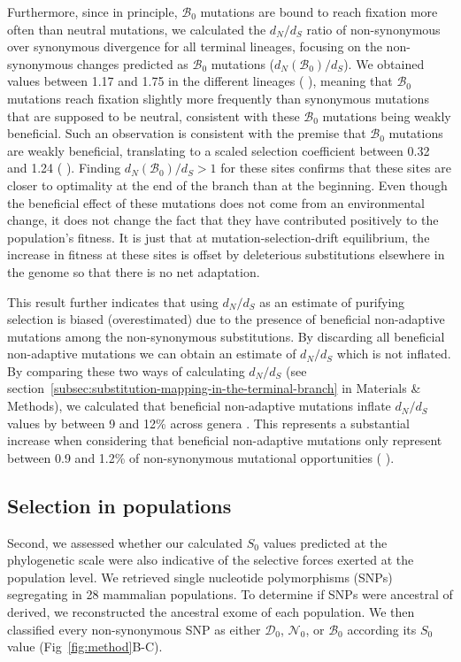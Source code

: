 \documentclass[10pt,letterpaper]{article}
\newcommand{\dn}{d_N}
\newcommand{\ds}{d_S}
\newcommand{\dnds}{\dn / \ds}
\newcommand{\Sphy}{S_{0}}
\newcommand{\SphyDel}{\mathcal{D}_0}
\newcommand{\SphyNeu}{\mathcal{N}_0}
\newcommand{\SphyBen}{\mathcal{B}_0}
\providecommand{\DIFaddtex}[1]{{\protect\color{blue}\uwave{#1}}} %
\providecommand{\DIFaddbegin}{} %
\providecommand{\DIFaddend}{} %
\providecommand{\DIFdelbegin}{} %
\providecommand{\DIFdelend}{} %
\providecommand{\DIFadd}[1]{\texorpdfstring{\DIFaddtex{#1}}{#1}} %
\newcommand{\DIFscaledelfig}{0.5}
\newlength{\DIFdelgraphicswidth} %
\newlength{\DIFdelgraphicsheight} %
\newcommand{\DIFaddincludegraphics}[2][]{{\color{blue}\fbox{\DIFOincludegraphics[#1]{#2}}}} %
\newcommand{\DIFdelincludegraphics}[2][]{%
\sbox{\DIFdelgraphicsbox}{\DIFOincludegraphics[#1]{#2}}%
\settoboxwidth{\DIFdelgraphicswidth}{\DIFdelgraphicsbox} %
\settoboxtotalheight{\DIFdelgraphicsheight}{\DIFdelgraphicsbox} %
\scalebox{\DIFscaledelfig}{%
\parbox[b]{\DIFdelgraphicswidth}{\usebox{\DIFdelgraphicsbox}\\[-\baselineskip] \rule{\DIFdelgraphicswidth}{0em}}\llap{\resizebox{\DIFdelgraphicswidth}{\DIFdelgraphicsheight}{%
\setlength{\unitlength}{\DIFdelgraphicswidth}%
\begin{picture}(1,1)%
\thicklines\linethickness{2pt} %
{\color[rgb]{1,0,0}\put(0,0){\framebox(1,1){}}}%
{\color[rgb]{1,0,0}\put(0,0){\line( 1,1){1}}}%
{\color[rgb]{1,0,0}\put(0,1){\line(1,-1){1}}}%
\end{picture}%
}\hspace*{3pt}}} %
} %
\DeclareRobustCommand{\DIFaddbegin}{\DIFOaddbegin \let\includegraphics\DIFaddincludegraphics} %
\DeclareRobustCommand{\DIFaddend}{\DIFOaddend \let\includegraphics\DIFOincludegraphics} %
\DeclareRobustCommand{\DIFdelbegin}{\DIFOdelbegin \let\includegraphics\DIFdelincludegraphics} %
\DeclareRobustCommand{\DIFdelend}{\DIFOaddend \let\includegraphics\DIFOincludegraphics} %
\begin{document}
Furthermore, since in principle, $\SphyBen$ mutations are bound to reach fixation more often than neutral mutations, we calculated the $\dnds$ ratio of non-synonymous over synonymous divergence for all terminal lineages, focusing on the non-synonymous changes predicted as $\SphyBen$ mutations ($\dn(\SphyBen) / \ds$).
We obtained values between 1.17 and 1.75 in the different lineages (\DIFdelbegin %
\DIFdelend \DIFaddbegin \DIFadd{Table~B in~}\DIFaddend ), meaning that $\SphyBen$ mutations reach fixation slightly more frequently than synonymous mutations that are supposed to be neutral, consistent with these $\SphyBen$ mutations being weakly beneficial.
Such an observation is consistent with the premise that $\SphyBen$ mutations are weakly beneficial, translating to a scaled selection coefficient between 0.32 and 1.24 (\DIFdelbegin %
\DIFdelend \DIFaddbegin \DIFadd{section~1.2 in~}\DIFaddend ).
Finding $\dn(\SphyBen) / \ds > 1$ for these sites confirms that these sites are closer to optimality at the end of the branch than at the beginning.
Even though the beneficial effect of these mutations does not come from an environmental change, it does not change the fact that they have contributed positively to the population’s fitness.
It is just that at mutation-selection-drift equilibrium, the increase in fitness at these sites is offset by deleterious substitutions elsewhere in the genome so that there is no net adaptation.

This result further indicates that using $\dnds$ as an estimate of purifying selection is biased (overestimated) due to the presence of beneficial non-adaptive mutations among the non-synonymous substitutions.
By discarding all beneficial non-adaptive mutations we can obtain an estimate of $\dnds$ which is not inflated.
By comparing these two ways of calculating $\dnds$ (see section~\ref{subsec:substitution-mapping-in-the-terminal-branch} in Materials \& Methods), we calculated that beneficial non-adaptive mutations inflate $\dnds$ values by between 9 and 12\% across genera \DIFaddbegin \DIFadd{(Table~C in~}\DIFadd{)}\DIFaddend .
This represents a substantial increase when considering that beneficial non-adaptive mutations only represent between 0.9 and 1.2\% of non-synonymous mutational opportunities (\DIFdelbegin %
\DIFdelend \DIFaddbegin \DIFadd{Table~A in~}\DIFaddend ).


\subsection*{Selection in populations}
Second, we assessed whether our calculated $\Sphy$ values predicted at the phylogenetic scale were also indicative of the selective forces exerted at the population level.
We retrieved single nucleotide polymorphisms (SNPs) segregating in 28 mammalian populations.
To determine if SNPs were ancestral of derived, we reconstructed the ancestral exome of each population.
We then classified every non-synonymous SNP as either $\SphyDel$, $\SphyNeu$, or $\SphyBen$ according its $\Sphy$ value (Fig~\ref{fig:method}B-C).
\end{document}
